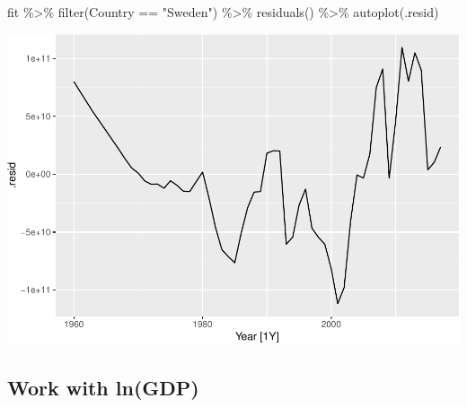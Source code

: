 \documentclass[
]{book}
\newenvironment{Shaded}{\begin{snugshade}}{\end{snugshade}}
\newcommand{\FunctionTok}[1]{\textcolor[rgb]{0.00,0.00,0.00}{#1}}
\newcommand{\NormalTok}[1]{#1}
\newcommand{\SpecialCharTok}[1]{\textcolor[rgb]{0.00,0.00,0.00}{#1}}
\newcommand{\StringTok}[1]{\textcolor[rgb]{0.31,0.60,0.02}{#1}}
\begin{document}
\begin{Shaded}
\begin{Highlighting}[]
\NormalTok{fit }\SpecialCharTok{\%\textgreater{}\%} \FunctionTok{filter}\NormalTok{(Country }\SpecialCharTok{==} \StringTok{"Sweden"}\NormalTok{) }\SpecialCharTok{\%\textgreater{}\%} \FunctionTok{residuals}\NormalTok{() }\SpecialCharTok{\%\textgreater{}\%} \FunctionTok{autoplot}\NormalTok{(.resid)}
\end{Highlighting}
\end{Shaded}

\includegraphics{graphics/unnamed-chunk-27-1.pdf}

\hypertarget{work-with-lngdp}{%
\subsection{Work with ln(GDP)}\label{work-with-lngdp}}

\begin{Shaded}
\end{Shaded}
\end{document}
